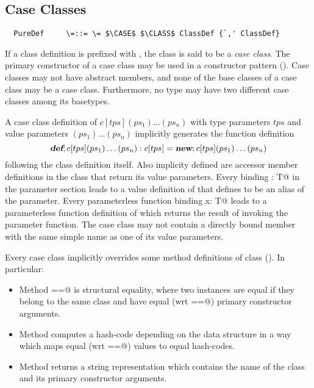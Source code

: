 \documentclass[11pt]{report}
\begin{document}
\begin{itemize}
\section{Case Classes}
\label{sec:datadef}

\syntax\begin{verbatim}
  PureDef     \=::= \= $\CASE$ $\CLASS$ ClassDef {`,' ClassDef}
\end{verbatim}

If a class definition is prefixed with \verb@case@, the class is said
to be a {\em case class}.  The primary constructor of a case class may
be used in a constructor pattern ().  Case classes
may not have abstract members, and none of the base classes of a case
class may be a case class. Furthermore, no type may have two different
case classes among its basetypes.

A case class definition of $c[tps](ps_1)\ldots(ps_n)$ with type
parameters $tps$ and value parameters $(ps_1)\ldots(ps_n)$ implicitly
generates the function definition
$$\mbox{\sl\bfseries def};c[tps](ps_1)\ldots(ps_n): c[tps] = \mbox{\sl\bfseries new};c[tps](ps_1)\ldots(ps_n)
$$
following the class definition itself.  Also implicity defined are
accessor member definitions in the class that return its value
parameters. Every binding \verb@x: T@ in the parameter section leads
to a value definition of \verb@x@ that defines \verb@x@
to be an alias of the parameter.  Every parameterless function binding
\verb@def x: T@ leads to a parameterless function definition of
\verb@x@ which returns the result of invoking the parameter function.
The case class may not contain a directly bound member with the same
simple name as one of its value parameters.

Every case class implicitly overrides some method definitions of class
\verb@Object@ (). In particular:
\begin{itemize}
\item[] Method \verb@==@ is structural equality, where two
instances are equal if they belong to the same class and
have equal (wrt \verb@==@) primary constructor arguments.
\item[] Method \verb@hashCode@ computes a hash-code
depending on the data structure in a way which maps equal (wrt
\verb@==@) values to equal hash-codes.
\item[] Method \verb@toString@ returns a string representation which
contains the name of the class and its primary constructor arguments.
\end{itemize}


\end{itemize}
\end{document}
